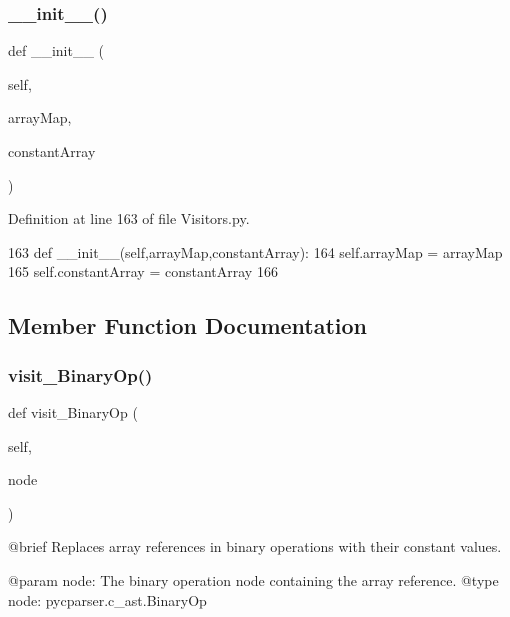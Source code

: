 \subsubsection{\texorpdfstring{\+\_\+\+\_\+init\+\_\+\+\_\+()}{\_\_init\_\_()}}
{\footnotesize\ttfamily def \+\_\+\+\_\+init\+\_\+\+\_\+ (\begin{DoxyParamCaption}\item[{}]{self,  }\item[{}]{array\+Map,  }\item[{}]{constant\+Array }\end{DoxyParamCaption})}



Definition at line 163 of file Visitors.\+py.


\begin{DoxyCode}
163     \textcolor{keyword}{def }\_\_init\_\_(self,arrayMap,constantArray):
164         self.arrayMap = arrayMap
165         self.constantArray = constantArray
166 
\end{DoxyCode}


\subsection{Member Function Documentation}
\mbox{\label{classVisitors_1_1ArrayValueReplacer_a6329fbf13e2d22de5384fbca843113b8}} 
\subsubsection{\texorpdfstring{visit\+\_\+\+Binary\+Op()}{visit\_BinaryOp()}}
{\footnotesize\ttfamily def visit\+\_\+\+Binary\+Op (\begin{DoxyParamCaption}\item[{}]{self,  }\item[{}]{node }\end{DoxyParamCaption})}

\begin{DoxyVerb}@brief Replaces array references in binary operations with their constant values.

@param node: The binary operation node containing the array reference.
@type node: pycparser.c_ast.BinaryOp
\end{DoxyVerb}
 

